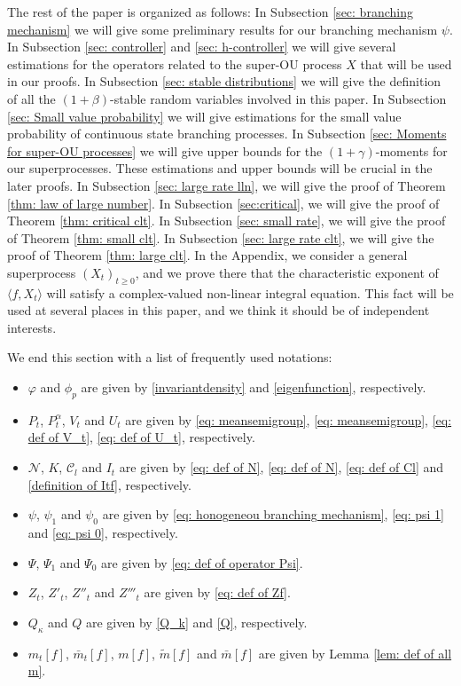 \documentclass[12pt,a4paper]{amsart}
\theoremstyle{plain}
\theoremstyle{definition}
\numberwithin{equation}{section}
\begin{document}
    The rest of the paper is organized as follows: In Subsection \ref{sec: branching mechanism} we will give some preliminary results for our branching mechanism $\psi$.
    In Subsection \ref{sec: controller} and \ref{sec: h-controller} we will give several estimations for the operators related to the super-OU process $X$ that will be used in our proofs.
    In Subsection \ref{sec: stable distributions} we will give the definition of all the $(1+\beta)$-stable random variables involved in this paper. 
    In Subsection \ref{sec: Small value probability} we will give estimations for the small value probability of continuous state branching processes. In Subsection \ref{sec: Moments for super-OU processes} we will give upper bounds for the $(1+\gamma)$-moments for our superprocesses. 
    These estimations and upper bounds will be crucial in the later proofs.
    In Subsection \ref{sec: large rate lln}, we will give the proof of Theorem \ref{thm: law of large number}.
    In Subsection \ref{sec:critical}, we will give the proof of Theorem \ref{thm: critical clt}.
    In Subsection \ref{sec: small rate}, we will give the proof of Theorem \ref{thm: small clt}.
    In Subsection \ref{sec: large rate clt}, we will give the proof of Theorem \ref{thm: large clt}.
    In the Appendix, we consider a general superprocess $(X_t)_{t\geq 0}$, and we prove there that the characteristic exponent of $\langle f,X_t\rangle$ will satisfy a complex-valued non-linear integral equation. 
    This fact will be used at several places in this paper, and we think it should be of independent interests.

    We end this section with a list of frequently used notations:
\begin{itemize}
\item
    $\varphi$ and $\phi_p$ are given by \eqref{invariantdensity} and \eqref{eigenfunction}, respectively.
\item
    $P_t$, $P^\alpha_t$, $V_t$ and $U_t$ are given by \eqref{eq: meansemigroup}, \eqref{eq: meansemigroup}, \eqref{eq: def of V_t}, \eqref{eq: def of U_t}, respectively.
\item
    $\mathcal N$, $K$, $\mathcal C_l$ and $I_t$ are given by \eqref{eq: def of N}, \eqref{eq: def of N},  \eqref{eq: def of Cl} and \eqref{definition of Itf}, respectively.
\item
    $\psi$, $\psi_1$ and $\psi_0$ are given by \eqref{eq: honogeneou branching mechanism}, \eqref{eq: psi 1} and \eqref{eq: psi 0}, respectively.
\item
    $\Psi$, $\Psi_1$ and $\Psi_0$ are given by \eqref{eq: def of operator Psi}.
\item
    $Z_t$, $Z'_t$, $Z''_t$ and $Z'''_t$ are given by \eqref{eq: def of Zf}.
\item
    $Q_\kappa$ and $Q$ are given by \eqref{Q_k} and \eqref{Q}, respectively.
\item
    $m_t[f]$, $\bar m_t[f]$, $m[f]$, $\tilde m[f]$ and $\bar m[f]$ are given by Lemma \ref{lem: def of all m}.
\end{itemize}
\end{document}
